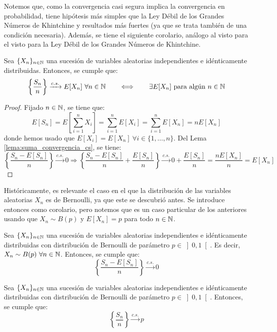 Notemos que, como la convergencia casi segura implica la convergencia en probabilidad, tiene hipótesis más simples que la Ley Débil de los Grandes Números de Khintchine y resultados más fuertes (ya que se trata también de una condición necesaria). Además, se tiene el siguiente corolario, análogo al visto para el visto para la Ley Débil de los Grandes Números de Khintchine.
\begin{coro}
    Sea $\{X_n\}_{n\in \mathbb{N}}$ una sucesión de variables aleatorias independientes e idénticamente distribuidas. Entonces, se cumple que:
    \begin{equation*}
        \left\{\frac{S_n}{n}\right\} \xrightarrow{c.s.} E[X_n]~\forall n\in \mathbb{N}
        \qquad \Longleftrightarrow \qquad \exists E[X_n] \text{ para algún } n\in \mathbb{N}
    \end{equation*}
\end{coro}
\begin{proof}
    Fijado $n\in \mathbb{N}$, se tiene que:
    \begin{equation*}
        E[S_n] = E\left[\sum_{i=1}^{n} X_i\right] = \sum_{i=1}^{n} E[X_i] = \sum_{i=1}^{n} E[X_n] = nE[X_n]
    \end{equation*}
    donde hemos usado que $E[X_i]=E[X_n]~\forall i\in \{1,\ldots,n\}$. Del Lema \ref{lema:suma_convergencia_cs}, se tiene:
    \begin{equation*}
        \left\{\frac{S_n-E[S_n]}{n}\right\} \xrightarrow{c.s.} 0 \Longrightarrow 
        \left\{\frac{S_n-E[S_n]}{n}+\frac{E[S_n]}{n}\right\} \xrightarrow{c.s.} 0+\frac{E[S_n]}{n}=\frac{nE[X_n]}{n}=E[X_n]
    \end{equation*}
\end{proof}

Históricamente, es relevante el caso en el que la distribución de las variables aleatorias $X_n$ es de Bernoulli, ya que este se descubrió antes. Se introduce entonces como corolario, pero notemos que es un caso particular de los anteriores usando que $X_n\sim B(p)$ y $E[X_n]=p$ para todo $n\in \mathbb{N}$.
\begin{coro}
    Sea $\{X_n\}_{n\in \mathbb{N}}$ una sucesión de variables aleatorias independientes e idénticamente distribuidas con distribución de Bernoulli de parámetro $p\in \left]0,1\right[$. Es decir, $X_n\sim B(p)~\forall n\in \mathbb{N}$. Entonces, se cumple que:
    \begin{equation*}
        \left\{\frac{S_n-E[S_n]}{n}\right\} \xrightarrow{c.s.} 0
    \end{equation*}
\end{coro}
\begin{coro}
    Sea $\{X_n\}_{n\in \mathbb{N}}$ una sucesión de variables aleatorias independientes e idénticamente distribuidas con distribución de Bernoulli de parámetro $p\in \left]0,1\right[$. Entonces, se cumple que:
    \begin{equation*}
        \left\{\frac{S_n}{n}\right\} \xrightarrow{c.s.} p
    \end{equation*}
\end{coro}


